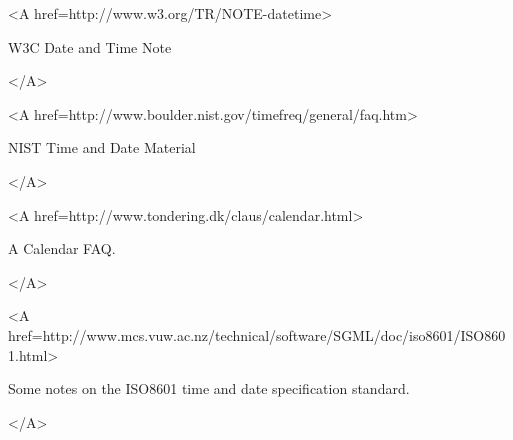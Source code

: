 \documentclass[english]{article}
\begin{document}
\begin{thebibliography}{99}
\begin{rawhtml}<A href=http://www.w3.org/TR/NOTE-datetime>\end{rawhtml}
W3C Date and Time Note
\begin{rawhtml}</A>\end{rawhtml}

\begin{rawhtml}<A href=http://www.boulder.nist.gov/timefreq/general/faq.htm>\end{rawhtml}
NIST Time and Date Material
\begin{rawhtml}</A>\end{rawhtml}

\begin{rawhtml}<A href=http://www.tondering.dk/claus/calendar.html>\end{rawhtml}
A Calendar FAQ.
\begin{rawhtml}</A>\end{rawhtml}

\begin{rawhtml}<A href=http://www.mcs.vuw.ac.nz/technical/software/SGML/doc/iso8601/ISO8601.html>\end{rawhtml}
Some notes on the ISO8601 time and date specification standard.
\begin{rawhtml}</A>\end{rawhtml}

\end{thebibliography}
\end{document}
